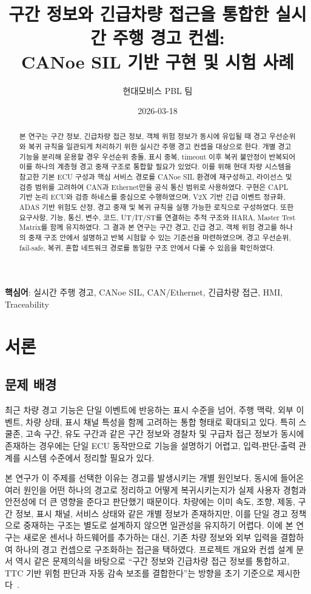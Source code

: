 \documentclass[11pt,a4paper]{article}
\title{구간 정보와 긴급차량 접근을 통합한 실시간 주행 경고 컨셉:\\CANoe SIL 기반 구현 및 시험 사례}
\author{현대모비스 PBL 팀}
\date{2026-03-18}
\begin{document}
\maketitle

\begin{abstract}
본 연구는 구간 정보, 긴급차량 접근 정보, 객체 위험 정보가 동시에 유입될 때 경고 우선순위와 복귀 규칙을 일관되게 처리하기 위한 실시간 주행 경고 컨셉을 대상으로 한다. 개별 경고 기능을 분리해 운용할 경우 우선순위 충돌, 표시 중복, timeout 이후 복귀 불안정이 반복되어 이를 하나의 계층형 경고 중재 구조로 통합할 필요가 있었다. 이를 위해 현대 차량 시스템을 참고한 기본 ECU 구성과 핵심 서비스 경로를 CANoe SIL 환경에 재구성하고, 라이선스 및 검증 범위를 고려하여 CAN과 Ethernet만을 공식 통신 범위로 사용하였다. 구현은 CAPL 기반 논리 ECU와 검증 하네스를 중심으로 수행하였으며, V2X 기반 긴급 이벤트 정규화, ADAS 기반 위험도 산정, 경고 중재 및 복귀 규칙을 실행 가능한 로직으로 구성하였다. 또한 요구사항, 기능, 통신, 변수, 코드, UT/IT/ST를 연결하는 추적 구조와 HARA, Master Test Matrix를 함께 유지하였다. 그 결과 본 연구는 구간 경고, 긴급 경고, 객체 위험 경고를 하나의 중재 구조 안에서 설명하고 반복 시험할 수 있는 기준선을 마련하였으며, 경고 우선순위, fail-safe, 복귀, 혼합 네트워크 경로를 동일한 구조 안에서 다룰 수 있음을 확인하였다.
\end{abstract}

\noindent\textbf{핵심어}: 실시간 주행 경고, CANoe SIL, CAN/Ethernet, 긴급차량 접근, HMI, Traceability

\section{서론}

\subsection{문제 배경}

최근 차량 경고 기능은 단일 이벤트에 반응하는 표시 수준을 넘어, 주행 맥락, 외부 이벤트, 차량 상태, 표시 채널 특성을 함께 고려하는 통합 형태로 확대되고 있다. 특히 스쿨존, 고속 구간, 유도 구간과 같은 구간 정보와 경찰차 및 구급차 접근 정보가 동시에 존재하는 경우에는 단일 ECU 동작만으로 기능을 설명하기 어렵고, 입력-판단-출력 관계를 시스템 수준에서 정리할 필요가 있다.

본 연구가 이 주제를 선택한 이유는 경고를 발생시키는 개별 원인보다, 동시에 들어온 여러 원인을 어떤 하나의 경고로 정리하고 어떻게 복귀시키는지가 실제 사용자 경험과 안전성에 더 큰 영향을 준다고 판단했기 때문이다. 차량에는 이미 속도, 조향, 제동, 구간 정보, 표시 채널, 서비스 상태와 같은 개별 정보가 존재하지만, 이를 단일 경고 정책으로 중재하는 구조는 별도로 설계하지 않으면 일관성을 유지하기 어렵다. 이에 본 연구는 새로운 센서나 하드웨어를 추가하는 대신, 기존 차량 정보와 외부 입력을 결합하여 하나의 경고 컨셉으로 구조화하는 접근을 택하였다. 프로젝트 개요와 컨셉 설계 문서 역시 같은 문제의식을 바탕으로 ``구간 정보와 긴급차량 접근 정보를 통합하고, TTC 기반 위험 판단과 자동 감속 보조를 결합한다''는 방향을 초기 기준으로 제시한다~\cite{proj_overview,concept_design}.
\end{document}
